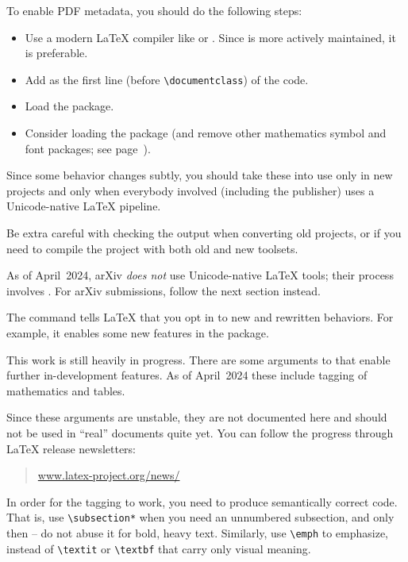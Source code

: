 To enable PDF metadata, you should do the following steps:
\begin{itemize}
\item Use a modern \LaTeX{} compiler like  or .
    Since  is more actively maintained, it is preferable.
\item Add  as the first line (before \verb|\documentclass|) of the code.
\item Load the  package.
\item Consider loading the  package
    (and remove other mathematics symbol and font packages;
    see page~\pageref{rem:math unicode}).
\end{itemize}

\begin{warning}
Since some behavior changes subtly,
you should take these into use only in new projects
and only when everybody involved (including the publisher) uses a Unicode-native \LaTeX{} pipeline.

Be extra careful with checking the output when converting old projects,
or if you need to compile the project with both old and new toolsets.
\end{warning}

\begin{warning}
As of April~2024, arXiv \emph{does not} use Unicode-native \LaTeX{} tools;
their process involves .
For arXiv submissions, follow the next section instead.
\end{warning}

The  command tells \LaTeX{} that you opt in
to new and rewritten behaviors.
For example, it enables some new features in the  package.

\begin{latexthree}
This work is still heavily in progress.
There are some arguments to  that enable further in-development features.
As of April~2024 these include tagging of mathematics and tables.

Since these arguments are unstable, they are not documented here
and should not be used in ``real'' documents quite yet.
You can follow the progress through \LaTeX{} release newsletters:
\begin{quote}
\url{www.latex-project.org/news/}
\end{quote}
\end{latexthree}

In order for the tagging to work,
you need to produce semantically correct code.
That is, use \verb|\subsection*| when you need an unnumbered subsection,
and only then -- do not abuse it for bold, heavy text.
Similarly, use \verb|\emph| to emphasize,
instead of \verb|\textit| or \verb|\textbf| that carry only visual meaning.


